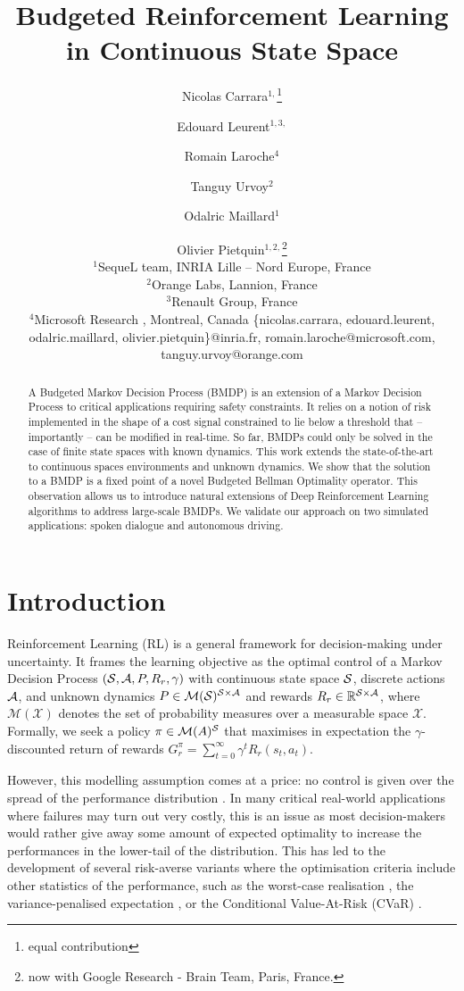 \documentclass{article}
\title{Budgeted Reinforcement Learning in Continuous State Space}
\author{
Nicolas Carrara$^{1,}$\thanks{equal contribution}\and
Edouard Leurent$^{1,3,}$\footnotemark[1]\and
Romain Laroche$^{4}$\and
Tanguy Urvoy$^{2}$\and
Odalric Maillard$^{1}$\and
Olivier Pietquin$^{1,2,}$\thanks{now with Google Research - Brain Team, Paris, France.}\\
\affiliations $^1$SequeL team, INRIA Lille -- Nord Europe, France\\
$^2$Orange Labs, Lannion, France\\
$^3$Renault Group, France\\
$^4$Microsoft Research , Montreal, Canada
\emails
\{nicolas.carrara, edouard.leurent, odalric.maillard, olivier.pietquin\}@inria.fr,
romain.laroche@microsoft.com, tanguy.urvoy@orange.com
}
\begin{document}
\maketitle
\begin{abstract}
    A Budgeted Markov Decision Process (BMDP) is an extension of a Markov Decision Process to critical applications requiring safety constraints. It relies on a notion of risk implemented in the shape of a cost signal constrained  to lie below a threshold that -- importantly -- can be modified in real-time. So far, BMDPs could only be solved in the case of finite state spaces with known dynamics. This work extends the state-of-the-art to continuous spaces environments and unknown dynamics. We show that the solution to a BMDP is a fixed point of a novel Budgeted Bellman Optimality operator. This observation allows us to introduce natural extensions of Deep Reinforcement Learning algorithms to address large-scale BMDPs. We validate our approach on two simulated applications: spoken dialogue and autonomous driving.
\end{abstract}

\section{Introduction}

Reinforcement Learning (RL) is a general framework for decision-making under uncertainty. It frames the learning objective as the optimal control of a Markov Decision Process  $(\mathcal{S}, \mathcal{A}, P, R_r, \gamma)$ with continuous state space $\mathcal{S}$, discrete actions $\mathcal{A}$, and unknown dynamics $P\in \mathcal{M}(\mathcal{S})^{\mathcal{S} \times \mathcal{A}}$ and rewards $R_r\in\mathbb{R}^{\mathcal{S} \times \mathcal{A}}$, where $\mathcal{M}(\mathcal{X})$ denotes the set of probability measures over a measurable space $\mathcal{X}$. Formally, we seek a policy $\pi\in\mathcal{M}(A)^{\mathcal{S}}$ that maximises in expectation the $\gamma$-discounted return of rewards $G_r^\pi = \sum_{t=0}^\infty \gamma^t R_r(s_t, a_t)$.

However, this modelling assumption comes at a price: no control is given over the spread of the performance distribution \citep{Dann2018}. In many critical real-world applications where failures may turn out very costly, this is an issue as most decision-makers would rather give away some amount of expected optimality to increase the performances in the lower-tail of the distribution. This has led to the development of several risk-averse variants where the optimisation criteria include other statistics of the performance, such as the worst-case realisation \citep{Iyengar2005,Nilim2005,Wiesemann2013}, the variance-penalised expectation \citep{Garcia2015,Tamar2012}, or the Conditional Value-At-Risk (CVaR) \citep{Chow2014,ChowGJP15}.
\end{document}
